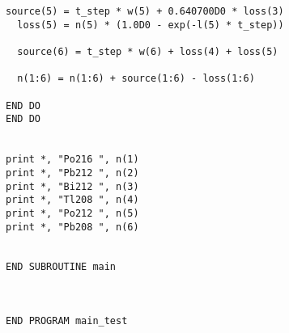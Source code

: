 \begin{lstlisting}[style=sFortran,caption={Activity V1 Input File}]
  source(5) = t_step * w(5) + 0.640700D0 * loss(3)
  loss(5) = n(5) * (1.0D0 - exp(-l(5) * t_step))

  source(6) = t_step * w(6) + loss(4) + loss(5)

  n(1:6) = n(1:6) + source(1:6) - loss(1:6)

END DO
END DO


print *, "Po216 ", n(1)
print *, "Pb212 ", n(2)
print *, "Bi212 ", n(3)
print *, "Tl208 ", n(4)
print *, "Po212 ", n(5)
print *, "Pb208 ", n(6)


END SUBROUTINE main



END PROGRAM main_test
\end{lstlisting}



